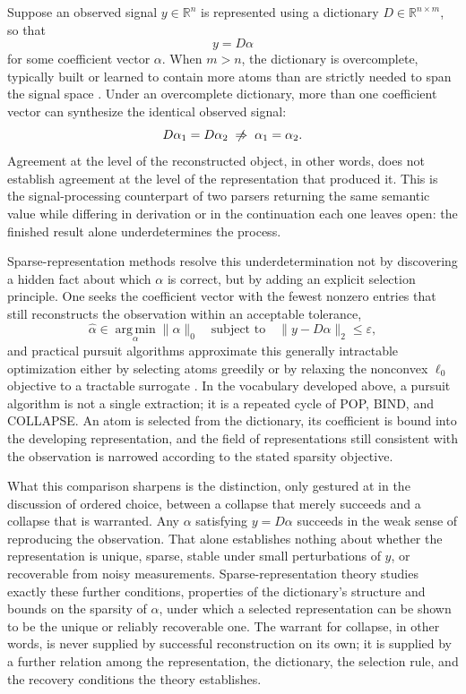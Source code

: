 \documentclass[11pt]{article}
\begin{document}
Suppose an observed signal $y \in \mathbb{R}^n$ is represented using a dictionary $D \in \mathbb{R}^{n \times m}$, so that
\[
y = D\alpha
\]
for some coefficient vector $\alpha$. When $m > n$, the dictionary is overcomplete, typically built or learned to contain more atoms than are strictly needed to span the signal space \cite{aharon-elad-bruckstein-2006}. Under an overcomplete dictionary, more than one coefficient vector can synthesize the identical observed signal:
\[
D\alpha_1 = D\alpha_2 \;\centernot\Rightarrow\; \alpha_1 = \alpha_2.
\]
Agreement at the level of the reconstructed object, in other words, does not establish agreement at the level of the representation that produced it. This is the signal-processing counterpart of two parsers returning the same semantic value while differing in derivation or in the continuation each one leaves open: the finished result alone underdetermines the process.

Sparse-representation methods resolve this underdetermination not by discovering a hidden fact about which $\alpha$ is correct, but by adding an explicit selection principle. One seeks the coefficient vector with the fewest nonzero entries that still reconstructs the observation within an acceptable tolerance,
\[
\widehat{\alpha} \in \operatorname*{arg\,min}_{\alpha} \|\alpha\|_0 \quad\text{subject to}\quad \|y - D\alpha\|_2 \leq \varepsilon,
\]
and practical pursuit algorithms approximate this generally intractable optimization either by selecting atoms greedily or by relaxing the nonconvex $\ell_0$ objective to a tractable surrogate \cite{bruckstein-elad-zibulevsky-2009}. In the vocabulary developed above, a pursuit algorithm is not a single extraction; it is a repeated cycle of POP, BIND, and COLLAPSE. An atom is selected from the dictionary, its coefficient is bound into the developing representation, and the field of representations still consistent with the observation is narrowed according to the stated sparsity objective.

What this comparison sharpens is the distinction, only gestured at in the discussion of ordered choice, between a collapse that merely succeeds and a collapse that is warranted. Any $\alpha$ satisfying $y = D\alpha$ succeeds in the weak sense of reproducing the observation. That alone establishes nothing about whether the representation is unique, sparse, stable under small perturbations of $y$, or recoverable from noisy measurements. Sparse-representation theory studies exactly these further conditions, properties of the dictionary's structure and bounds on the sparsity of $\alpha$, under which a selected representation can be shown to be the unique or reliably recoverable one. The warrant for collapse, in other words, is never supplied by successful reconstruction on its own; it is supplied by a further relation among the representation, the dictionary, the selection rule, and the recovery conditions the theory establishes.
\end{document}
